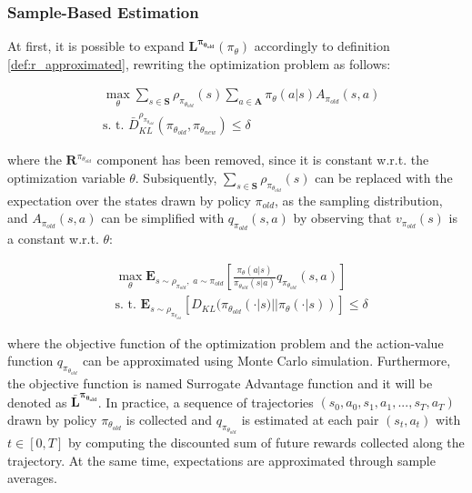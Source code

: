             \subsubsection{Sample-Based Estimation}
                At first, it is possible to expand $\mathbf{L^{\pi_{\theta_{old}}}}(\pi_{\theta})$ accordingly to definition \ref{def:r_approximated}, rewriting the optimization problem as follows:
                
                \begin{align}
                    \label{eq:trpo_opt_L_expanded}
                    &\max_{\theta} \sum_{s \in \mathbf{S}} \rho_{\pi_{\theta_{old}}}(s) \sum_{a \in \mathbf{A}} \pi_{\theta}(a|s) A_{\pi_{old}}(s, a) \\
                    &\text{s. t. } \bar{D}^{\rho_{\pi_{\theta_{old}}}}_{KL} (\pi_{\theta_{old}}, \pi_{\theta_{new}}) \leq \delta \nonumber
                \end{align}
                
                where the $\mathbf{R}^{\pi_{\theta_{old}}}$ component has been removed, since it is constant w.r.t. the optimization variable $\theta$. Subsiquently, $\sum_{s \in \mathbf{S}} \rho_{\pi_{\theta_{old}}}(s)$ can be replaced with the expectation over the states drawn by policy $\pi_{old}$, as the sampling distribution, and $A_{\pi_{old}}(s, a)$ can be simplified with $q_{\pi_{old}}(s, a)$ by observing that $v_{\pi_{old}}(s)$ is a constant w.r.t. $\theta$:
                
                \begin{align}
                    \label{eq:trpo_opt_expectation}
                    &\max_{\theta} \mathbf{E}_{s\sim\rho_{\pi_{old}},\;a\sim\pi_{old}} \left[ \frac{\pi_{\theta}(a|s)}{\pi_{\theta_{old}}(s|a)} q_{\pi_{\theta_{old}}}(s,a)\right] \\
                    &\text{s. t. } \mathbf{E}_{s\sim\rho_{\pi_{\theta_{old}}}} \left[ D_{KL} ( \pi_{\theta_{old}}(\cdot|s) || \pi_{\theta} (\cdot|s) ) \right] \leq \delta \nonumber
                \end{align}
                
                where the objective function of the optimization problem and the action-value function $q_{\pi_{\theta_{old}}}$ can be approximated using Monte Carlo simulation. Furthermore, the objective function is named Surrogate Advantage function and it will be denoted as $\mathbf{\bar{L}^{\pi_{\theta_{old}}}}$. \newline
                In practice, a sequence of trajectories $(s_0, a_0, s_1, a_1, ..., s_T, a_T)$ drawn by policy $\pi_{\theta_{old}}$ is collected and $q_{\pi_{\theta_{old}}}$ is estimated at each pair $(s_t, a_t)$ with $t \in [0, T]$ by computing the discounted sum of future rewards collected along the trajectory. At the same time, expectations are approximated through sample averages.
                
